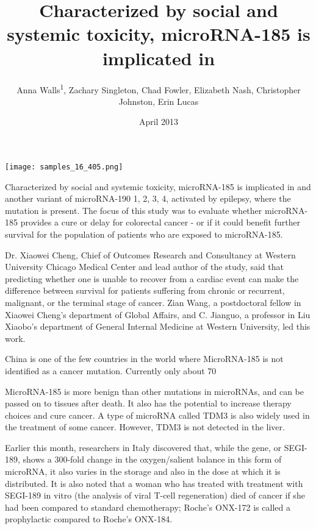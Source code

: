 \documentclass{article}
\title{Characterized by social and systemic toxicity, microRNA-185 is implicated in}
\author{Anna Walls\textsuperscript{1},  Zachary Singleton,  Chad Fowler,  Elizabeth Nash,  Christopher Johnston,  Erin Lucas}
\affil{\textsuperscript{1}Institute for High Energy Physics}
\date{April 2013}
\begin{document}
\maketitle

\begin{center}
\begin{minipage}{0.75\linewidth}
\texttt{[image: samples\_16\_405.png]}
\end{minipage}
\end{center}

Characterized by social and systemic toxicity, microRNA-185 is implicated in and another variant of microRNA-190 1, 2, 3, 4, activated by epilepsy, where the mutation is present. The focus of this study was to evaluate whether microRNA-185 provides a cure or delay for colorectal cancer - or if it could benefit further survival for the population of patients who are exposed to microRNA-185.

Dr. Xiaowei Cheng, Chief of Outcomes Research and Consultancy at Western University Chicago Medical Center and lead author of the study, said that predicting whether one is unable to recover from a cardiac event can make the difference between survival for patients suffering from chronic or recurrent, malignant, or the terminal stage of cancer. Zian Wang, a postdoctoral fellow in Xiaowei Cheng's department of Global Affairs, and C. Jianguo, a professor in Liu Xiaobo's department of General Internal Medicine at Western University, led this work.

China is one of the few countries in the world where MicroRNA-185 is not identified as a cancer mutation. Currently only about 70%

MicroRNA-185 is more benign than other mutations in microRNAs, and can be passed on to tissues after death. It also has the potential to increase therapy choices and cure cancer. A type of microRNA called TDM3 is also widely used in the treatment of some cancer. However, TDM3 is not detected in the liver.

Earlier this month, researchers in Italy discovered that, while the gene, or SEGI-189, shows a 300-fold change in the oxygen/salient balance in this form of microRNA, it also varies in the storage and also in the dose at which it is distributed. It is also noted that a woman who has treated with treatment with SEGI-189 in vitro (the analysis of viral T-cell regeneration) died of cancer if she had been compared to standard chemotherapy; Roche's ONX-172 is called a prophylactic compared to Roche's ONX-184.
\end{document}

